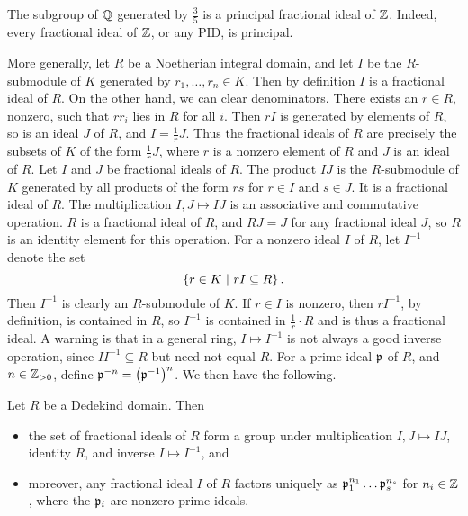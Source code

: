 \begin{example*}
The subgroup of $ \mathbb{Q} $ generated by $ \tfrac{3}{5} $ is a principal fractional ideal of $ \mathbb{Z} $. Indeed, every fractional ideal of $ \mathbb{Z} $, or any PID, is principal.
\end{example*}

More generally, let $ R $ be a Noetherian integral domain, and let $ I $ be the $ R $-submodule of $ K $ generated by $ r_1, \dots, r_n \in K $. Then by definition $ I $ is a fractional ideal of $ R $. On the other hand, we can clear denominators. There exists an $ r \in R $, nonzero, such that $ rr_i $ lies in $ R $ for all $ i $. Then $ rI $ is generated by elements of $ R $, so is an ideal $ J $ of $ R $, and $ I = \tfrac{1}{r}J $. Thus the fractional ideals of $ R $ are precisely the subsets of $ K $ of the form $ \tfrac{1}{r}J $, where $ r $ is a nonzero element of $ R $ and $ J $ is an ideal of $ R $. Let $ I $ and $ J $ be fractional ideals of $ R $. The product $ IJ $ is the $ R $-submodule of $ K $ generated by all products of the form $ rs $ for $ r \in I $ and $ s \in J $. It is a fractional ideal of $ R $. The multiplication $ I, J \mapsto IJ $ is an associative and commutative operation. $ R $ is a fractional ideal of $ R $, and $ RJ = J $ for any fractional ideal $ J $, so $ R $ is an identity element for this operation. For a nonzero ideal $ I $ of $ R $, let $ I^{-1} $ denote the set
$$ \cbr{r \in K \st rI \subseteq R}. $$
Then $ I^{-1} $ is clearly an $ R $-submodule of $ K $. If $ r \in I $ is nonzero, then $ rI^{-1} $, by definition, is contained in $ R $, so $ I^{-1} $ is contained in $ \tfrac{1}{r} \cdot R $ and is thus a fractional ideal. A warning is that in a general ring, $ I \mapsto I^{-1} $ is not always a good inverse operation, since $ II^{-1} \subseteq R $ but need not equal $ R $. For a prime ideal $ \mathfrak{p} $ of $ R $, and $ n \in \mathbb{Z}_{> 0} $, define $ \ppp^{-n} = \br{\ppp^{-1}}^n $. We then have the following.

\begin{theorem}
Let $ R $ be a Dedekind domain. Then
\begin{itemize}
\item the set of fractional ideals of $ R $ form a group under multiplication $ I, J \mapsto IJ $, identity $ R $, and inverse $ I \mapsto I^{-1} $, and
\item moreover, any fractional ideal $ I $ of $ R $ factors uniquely as $ \mathfrak{p}_1^{n_1} \dots \mathfrak{p}_s^{n_s} $ for $ n_i \in \mathbb{Z} $, where the $ \mathfrak{p}_i $ are nonzero prime ideals.
\end{itemize}
\end{theorem}


